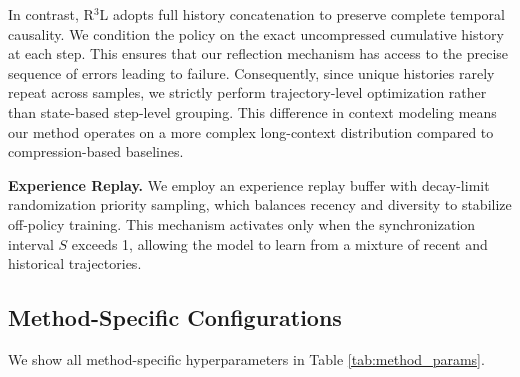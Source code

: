 In contrast, R$^3$L adopts full history concatenation to preserve complete temporal causality. We condition the policy on the exact uncompressed cumulative history at each step. This ensures that our reflection mechanism has access to the precise sequence of errors leading to failure. Consequently, since unique histories rarely repeat across samples, we strictly perform trajectory-level optimization rather than state-based step-level grouping. This difference in context modeling means our method operates on a more complex long-context distribution compared to compression-based baselines.

\textbf{Experience Replay.} We employ an experience replay buffer with decay-limit randomization priority sampling, which balances recency and diversity to stabilize off-policy training. This mechanism activates only when the synchronization interval $S$ exceeds 1, allowing the model to learn from a mixture of recent and historical trajectories.

\begin{table}[h]
\centering
\small
{}
\caption{Summary of training hyperparameters shared across all methods.}
\label{tab:hyperparams}
\end{table}

\subsection{Method-Specific Configurations}
We show all method-specific hyperparameters in Table \ref{tab:method_params}.


